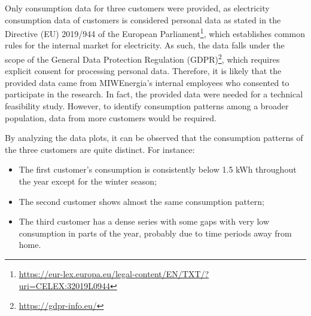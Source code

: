 Only consumption data for three customers were provided, as electricity consumption data of customers is considered personal data as stated in the Directive (EU) 2019/944 of the European Parliament\footnote{ \url{https://eur-lex.europa.eu/legal-content/EN/TXT/?uri=CELEX:32019L0944} }, which establishes common rules for the internal market for electricity.
As such, the data falls under the scope of the General Data Protection Regulation (GDPR)\footnote{ \url{https://gdpr-info.eu/} }, which requires explicit consent for processing personal data.
Therefore, it is likely that the provided data came from MIWEnergia's internal employees who consented to participate in the research.
In fact, the provided data were needed for a technical feasibility study.
However, to identify consumption patterns among a broader population, data from more customers would be required.

By analyzing the data plots, it can be observed that the consumption patterns of the three customers are quite distinct.
For instance:
\begin{itemize}
  \item The first customer's consumption is consistently below 1.5 kWh throughout the year except for the winter season;
  \item The second customer shows almost the same consumption pattern;
  \item The third customer has a dense series with some gaps with very low consumption in parts of the year, probably due to time periods away from home.
\end{itemize}

